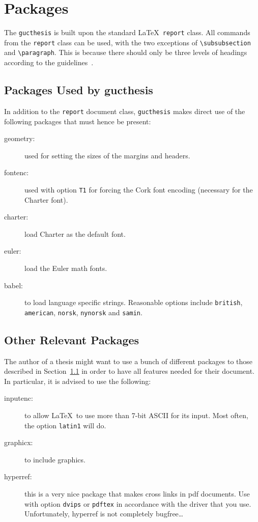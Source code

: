 \chapter{Packages}
\label{chap:packages}

The \texttt{gucthesis} is built upon the standard \LaTeX\
\texttt{report} class. All commands from the \texttt{report} class can
be used, with the two exceptions of \verb+\subsubsection+ and
\verb+\paragraph+. This is because there should only be three
levels of headings according to the guidelines~\cite{GUCMaster}.

\section{Packages Used by gucthesis}
\label{sec:packages}

In addition to the \texttt{report} document class,
\texttt{gucthesis} makes direct use of the following packages
that must hence be present:
\begin{description}
	\item[geometry:] used for setting the sizes of the margins and
  	headers.
	\item[fontenc:] used with option \texttt{T1} for forcing the Cork font
  	encoding (necessary for the Charter font).
	\item[charter:] load Charter as the default font.
	\item[euler:] load the Euler math fonts.
	\item[babel:] to load language specific strings. Reasonable options
	  include \texttt{british}, \texttt{american}, \texttt{norsk},
	  \texttt{nynorsk} and \texttt{samin}.
\end{description}

\section{Other Relevant Packages}
\label{sec:otherpackages}

The author of a thesis might want to use a bunch of different packages
to those described in Section~\ref{sec:packages} in order to have all features needed for their document. 
In particular, it is advised to use the following:
\begin{description}
	\item[inputenc:] to allow \LaTeX\ to use more than 7-bit ASCII for its
	  input. Most often, the option \texttt{latin1} will do.
	\item[graphicx:] to include graphics.
	\item[hyperref:] this is a very nice package that makes cross links in
	  pdf documents. Use with option \texttt{dvips} or \texttt{pdftex}
	  in accordance with the driver that you use. Unfortunately, hyperref
	  is not completely bugfree\dots
\end{description}